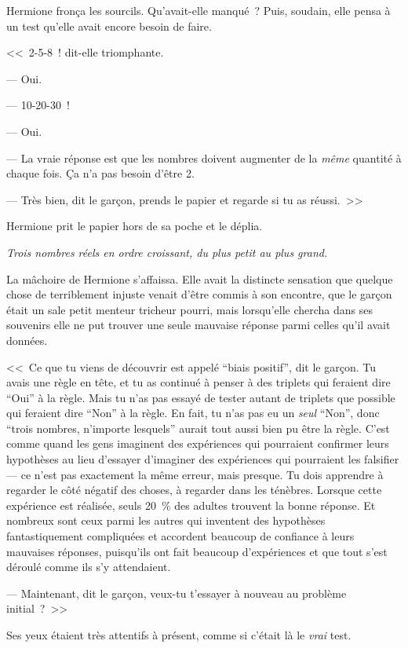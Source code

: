 Hermione fronça les sourcils. Qu'avait-elle manqué~? Puis, soudain, elle pensa à un test qu'elle avait encore besoin de faire.

<<~2-5-8~! dit-elle triomphante.

--- Oui.

--- 10-20-30~!

--- Oui.

--- La vraie réponse est que les nombres doivent augmenter de la \emph{même} quantité à chaque fois. Ça n'a pas besoin d'être 2.

--- Très bien, dit le garçon, prends le papier et regarde si tu as réussi.~>>

Hermione prit le papier hors de sa poche et le déplia.

\emph{Trois nombres réels en ordre croissant, du plus petit au plus grand.}

La mâchoire de Hermione s'affaissa. Elle avait la distincte sensation que quelque chose de terriblement injuste venait d'être commis à son encontre, que le garçon était un sale petit menteur tricheur pourri, mais lorsqu'elle chercha dans ses souvenirs elle ne put trouver une seule mauvaise réponse parmi celles qu'il avait données.

<<~Ce que tu viens de découvrir est appelé “biais positif”, dit le garçon. Tu avais une règle en tête, et tu as continué à penser à des triplets qui feraient dire “Oui” à la règle. Mais tu n'as pas essayé de tester autant de triplets que possible qui feraient dire “Non” à la règle. En fait, tu n'as pas eu un \emph{seul} “Non”, donc “trois nombres, n'importe lesquels” aurait tout aussi bien pu être la règle. C'est comme quand les gens imaginent des expériences qui pourraient confirmer leurs hypothèses au lieu d'essayer d'imaginer des expériences qui pourraient les falsifier — ce n'est pas exactement la même erreur, mais presque. Tu dois apprendre à regarder le côté négatif des choses, à regarder dans les ténèbres. Lorsque cette expérience est réalisée, seuls 20~\% des adultes trouvent la bonne réponse. Et nombreux sont ceux parmi les autres qui inventent des hypothèses fantastiquement compliquées et accordent beaucoup de confiance à leurs mauvaises réponses, puisqu'ils ont fait beaucoup d'expériences et que tout s'est déroulé comme ils s'y attendaient.

--- Maintenant, dit le garçon, veux-tu t'essayer à nouveau au problème initial~?~>>

Ses yeux étaient très attentifs à présent, comme si c'était là le \emph{vrai} test.

